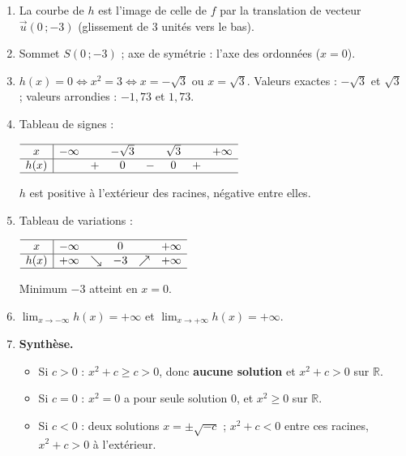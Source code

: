 \documentclass[11pt,a4paper]{article}
\newcommand{\R}{\mathbb{R}}
\begin{document}
\begin{enumerate}[leftmargin=1.4em,itemsep=3pt]
  \item La courbe de $h$ est l'image de celle de $f$ par la translation de vecteur $\vec{u}(0\,;-3)$
  (glissement de $3$ unités vers le bas).

  \item Sommet $S(0\,;-3)$ ; axe de symétrie : l'axe des ordonnées ($x=0$).

  \item $h(x)=0\iff x^2=3\iff x=-\sqrt{3}$ ou $x=\sqrt{3}$.
  Valeurs exactes : $-\sqrt{3}$ et $\sqrt{3}$ ; valeurs arrondies : $-1{,}73$ et $1{,}73$.

  \item Tableau de signes :
  \begin{center}
  $\begin{array}{c|ccccccc}
  \hline
  x & -\infty & & -\sqrt{3} & & \sqrt{3} & & +\infty\\ \hline
  h(x) & & + & 0 & - & 0 & + & \\ \hline
  \end{array}$
  \end{center}
  $h$ est positive à l'extérieur des racines, négative entre elles.

  \item Tableau de variations :
  \begin{center}
  $\begin{array}{c|ccccc}
  \hline
  x & -\infty & & 0 & & +\infty\\ \hline
  h(x) & +\infty & \searrow & -3 & \nearrow & +\infty\\ \hline
  \end{array}$
  \end{center}
  Minimum $-3$ atteint en $x=0$.

  \item $\displaystyle\lim_{x\to-\infty}h(x)=+\infty$ et $\displaystyle\lim_{x\to+\infty}h(x)=+\infty$.

  \item \textbf{Synthèse.}
  \begin{itemize}[leftmargin=1.2em,itemsep=1pt]
    \item Si $c>0$ : $x^2+c\geq c>0$, donc \textbf{aucune solution} et $x^2+c>0$ sur $\R$.
    \item Si $c=0$ : $x^2=0$ a pour seule solution $0$, et $x^2\geq 0$ sur $\R$.
    \item Si $c<0$ : deux solutions $x=\pm\sqrt{-c}$ ; $x^2+c<0$ entre ces racines, $x^2+c>0$ à l'extérieur.
  \end{itemize}
\end{enumerate}
\end{document}
